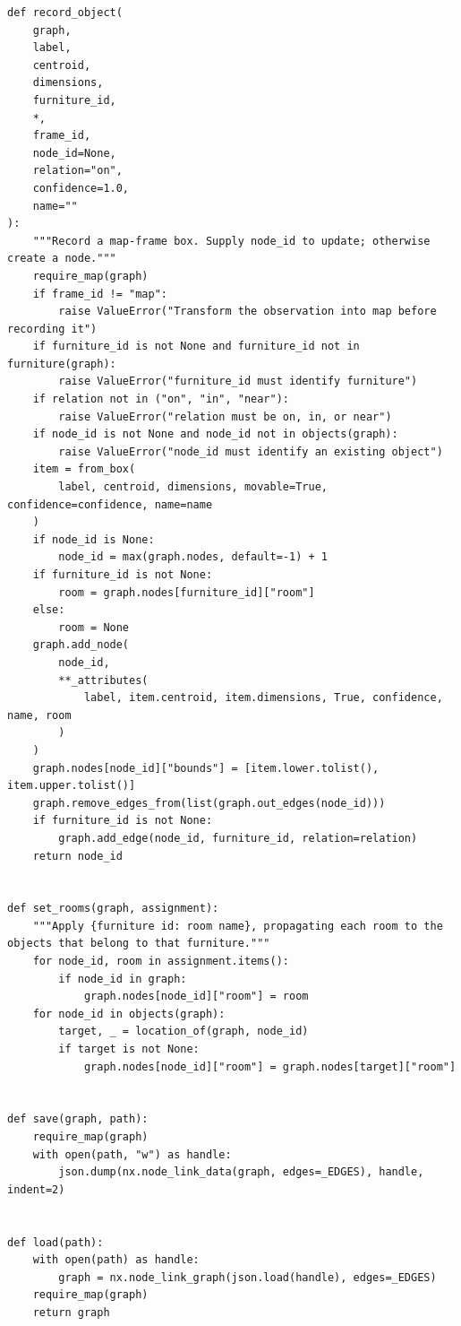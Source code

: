 \documentclass[11pt,a4paper]{book}
\begin{document}
\begin{lstlisting}
def record_object(
    graph,
    label,
    centroid,
    dimensions,
    furniture_id,
    *,
    frame_id,
    node_id=None,
    relation="on",
    confidence=1.0,
    name=""
):
    """Record a map-frame box. Supply node_id to update; otherwise create a node."""
    require_map(graph)
    if frame_id != "map":
        raise ValueError("Transform the observation into map before recording it")
    if furniture_id is not None and furniture_id not in furniture(graph):
        raise ValueError("furniture_id must identify furniture")
    if relation not in ("on", "in", "near"):
        raise ValueError("relation must be on, in, or near")
    if node_id is not None and node_id not in objects(graph):
        raise ValueError("node_id must identify an existing object")
    item = from_box(
        label, centroid, dimensions, movable=True, confidence=confidence, name=name
    )
    if node_id is None:
        node_id = max(graph.nodes, default=-1) + 1
    if furniture_id is not None:
        room = graph.nodes[furniture_id]["room"]
    else:
        room = None
    graph.add_node(
        node_id,
        **_attributes(
            label, item.centroid, item.dimensions, True, confidence, name, room
        )
    )
    graph.nodes[node_id]["bounds"] = [item.lower.tolist(), item.upper.tolist()]
    graph.remove_edges_from(list(graph.out_edges(node_id)))
    if furniture_id is not None:
        graph.add_edge(node_id, furniture_id, relation=relation)
    return node_id


def set_rooms(graph, assignment):
    """Apply {furniture id: room name}, propagating each room to the objects that belong to that furniture."""
    for node_id, room in assignment.items():
        if node_id in graph:
            graph.nodes[node_id]["room"] = room
    for node_id in objects(graph):
        target, _ = location_of(graph, node_id)
        if target is not None:
            graph.nodes[node_id]["room"] = graph.nodes[target]["room"]


def save(graph, path):
    require_map(graph)
    with open(path, "w") as handle:
        json.dump(nx.node_link_data(graph, edges=_EDGES), handle, indent=2)


def load(path):
    with open(path) as handle:
        graph = nx.node_link_graph(json.load(handle), edges=_EDGES)
    require_map(graph)
    return graph
\end{lstlisting}
\end{document}
